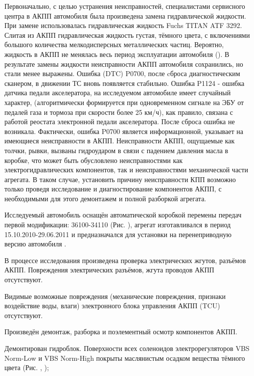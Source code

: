 Первоначально, с целью устранения неисправностей, специалистами сервисного центра  в АКПП автомобиля была произведена замена гидравлической жидкости. При замене использовалась гидравлическая жидкость Fuchs TITAN ATF 3292.    Слитая из АКПП гидравлическая жидкость густая,  тёмного цвета,  с включениями большого количества мелкодисперсных металлических частиц.  Вероятно, жидкость в АКПП не менялась весь период эксплуатации автомобиля ().  В результате замены жидкости %
неисправности АКПП автомобиля сохранились, но стали менее выражены.  Ошибка (DTC) P0700, после cброса диагностическим сканером, в движении ТС вновь появляется стабильно. Ошибка P1124 - ошибка датчика педали акселератора, на исследуемом автомобиле имеет случайный характер, (алгоритмически формируется при  одновременном сигнале на ЭБУ от педалей газа и тормоза  при скорости более 25 км/ч), как правило,  связана с  работой реостата электронной педали акселератора. После сброса ошибка  не возникала.   Фактически, ошибка P0700 является информационной, указывает на имеющиеся неисправности в АКПП.    Неисправности АКПП, ощущаемые как толчки, рывки, вызваны гидроударом в связи с падением давления масла в коробке, что может быть обусловлено неисправностями как электрогидравлических компонентов, так и неисправностями механической части агрегата. В таком случае, установить причину неисправности КПП возможно только проведя исследование и диагностирование  компонентов АКПП, с необходимыми для этого  демонтажем и полной разборкой агрегата.

Исследуемый автомобиль оснащён автоматической коробкой перемены передач  первой модификации: 36100-34110 (Рис. ), агрегат изготавливался в период 15.10.2010-29.06.2011 и предназначался для установки на перенеприводную версию автомобиля .

В процессе исследования произведена проверка электрических жгутов, разъёмов АКПП. Повреждения электрических разъёмов, жгута проводов АКПП отсутствуют.

Видимые возможные повреждения (механические повреждения, признаки воздействие воды, влаги)  электронного блока управления АКПП (TCU) отсутствуют.

Произведён демонтаж, разборка и поэлементный осмотр   компонентов АКПП.

Демонтирован гидроблок. Поверхности всех соленоидов электрорегуляторов VBS Norm-Low  и VBS Norm-High покрыты маслянистым осадком вещества тёмного цвета (Рис. , ); 

